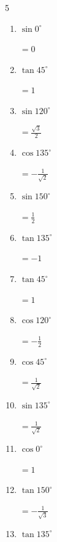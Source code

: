 \begin{multicols}{5}
\begin{enumerate}
        $\displaystyle =\frac{1}{\sqrt{3}}$

  \item $\displaystyle \sin{0^\circ}$

        $\displaystyle =0$

  \item $\displaystyle \tan{45^\circ}$

        $\displaystyle =1$

  \item $\displaystyle \sin{120^\circ}$

        $\displaystyle =\frac{\sqrt{3}}{2}$

\columnbreak %

  \item $\displaystyle \cos{135^\circ}$

        $\displaystyle =-\frac{1}{\sqrt{2}}$

  \item $\displaystyle \sin{150^\circ}$

        $\displaystyle =\frac{1}{2}$

  \item $\displaystyle \tan{135^\circ}$

        $\displaystyle =-1$

  \item $\displaystyle \tan{45^\circ}$

        $\displaystyle =1$

  \item $\displaystyle \cos{120^\circ}$

        $\displaystyle =-\frac{1}{2}$

  \item $\displaystyle \cos{45^\circ}$

        $\displaystyle =\frac{1}{\sqrt{2}}$

  \item $\displaystyle \sin{135^\circ}$

        $\displaystyle =\frac{1}{\sqrt{2}}$

  \item $\displaystyle \cos{0^\circ}$

        $\displaystyle =1$

  \item $\displaystyle \tan{150^\circ}$

        $\displaystyle =-\frac{1}{\sqrt{3}}$

  \item $\displaystyle \tan{135^\circ}$


\end{enumerate}
\end{multicols}
